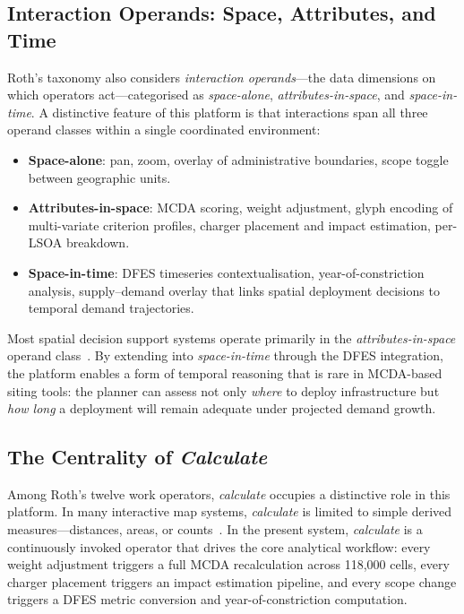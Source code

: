 \subsection{Interaction Operands: Space, Attributes, and Time}
\label{sec:roth-operands}

Roth's taxonomy also considers \emph{interaction operands}---the data dimensions on which operators act---categorised as \emph{space-alone}, \emph{attributes-in-space}, and \emph{space-in-time}. A distinctive feature of this platform is that interactions span all three operand classes within a single coordinated environment:

\begin{itemize}[nosep]
    \item \textbf{Space-alone}: pan, zoom, overlay of administrative boundaries, scope toggle between geographic units.
    \item \textbf{Attributes-in-space}: MCDA scoring, weight adjustment, glyph encoding of multi-variate criterion profiles, charger placement and impact estimation, per-LSOA breakdown.
    \item \textbf{Space-in-time}: DFES timeseries contextualisation, year-of-constriction analysis, supply--demand overlay that links spatial deployment decisions to temporal demand trajectories.
\end{itemize}

\noindent Most spatial decision support systems operate primarily in the \emph{attributes-in-space} operand class~\cite{roth2013taxonomy,andrienko2007geovisual}. By extending into \emph{space-in-time} through the DFES integration, the platform enables a form of temporal reasoning that is rare in MCDA-based siting tools: the planner can assess not only \emph{where} to deploy infrastructure but \emph{how long} a deployment will remain adequate under projected demand growth.

\subsection{The Centrality of \emph{Calculate}}
\label{sec:roth-calculate}

Among Roth's twelve work operators, \emph{calculate} occupies a distinctive role in this platform. In many interactive map systems, \emph{calculate} is limited to simple derived measures---distances, areas, or counts~\cite{roth2013taxonomy}. In the present system, \emph{calculate} is a continuously invoked operator that drives the core analytical workflow: every weight adjustment triggers a full MCDA recalculation across 118,000 cells, every charger placement triggers an impact estimation pipeline, and every scope change triggers a DFES metric conversion and year-of-constriction computation.

